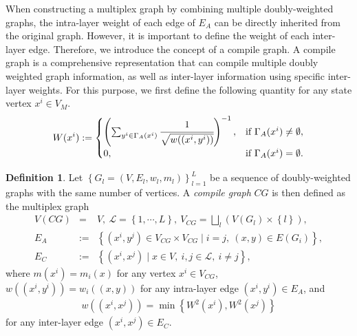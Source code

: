 \documentclass[preprint,12pt,number]{elsarticle}
\theoremstyle{plain} %
\theoremstyle{definition} %
\newtheorem{definition}[theorem]{\indent\sc Definition}
\begin{document}
When constructing a multiplex graph by combining multiple doubly-weighted graphs, the intra-layer weight of each edge of $E_A$ can be directly inherited from the original graph. However, it is important to define the weight of each inter-layer edge. Therefore, we introduce the concept of a compile graph. 
A compile graph is a comprehensive representation that can compile multiple doubly weighted graph information, as well as inter-layer information using specific inter-layer weights.
For this purpose, we first define the following quantity for any state vertex $x^i \in V_M$.
\begin{eqnarray*}
    W(x^i) := 
    \begin{cases}
        \left( \sum_{y^i \in \Gamma_A (x^i)} \cfrac{1}{\sqrt{w((x^i,y^i))}}\right)^{-1},& \text{if}\ \Gamma_A(x^i) \neq \emptyset,\\
        0,& \text{if}\ \Gamma_A(x^i) = \emptyset.
    \end{cases}
\end{eqnarray*}
\begin{definition}
    Let $\left\{G_l = (V, E_l, w_l, m_l) \right\}_{l=1}^L$ be a sequence of doubly-weighted graphs with the same number of vertices. 
    A \textit{compile graph} $CG$ is then defined as the multiplex graph     \begin{eqnarray*}
        V(CG) &=& V,\ \mathcal{L} = \left\{1, \cdots, L \right\},\ V_{CG} = \bigsqcup_l (V(G_l) \times \left\{l \right\}),\\
        E_A &:=& \left\{(x^i,y^j) \in V_{CG} \times V_{CG} \mid i=j,\ (x,y) \in E(G_i)\right\},\\
        E_C &:=& \left\{ (x^i,x^j) \mid x \in V,\ i,j\in \mathcal{L},\ i \neq j \right\},
    \end{eqnarray*}
   where $m(x^i) = m_i(x)$ for any vertex $x^i \in V_{CG}$, $w((x^i,y^i)) = w_i ((x,y))$ for any intra-layer edge $(x^i, y^i) \in E_A$, and
    \begin{eqnarray*}
    w((x^i,x^j)) = \min \left\{ W^2(x^i), W^2(x^j) \right\} 
    \end{eqnarray*}
    for any inter-layer edge $(x^i,x^j) \in E_C$.  
\end{definition}
\end{document}
